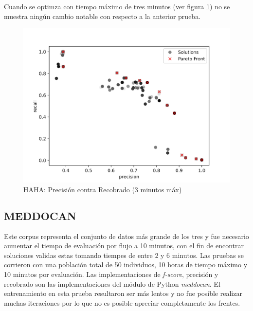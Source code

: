 Cuando se optimza con tiempo m\'aximo de tres minutos (ver figura \ref{impl:fig:haha:precision_vs_recall_3min}) no se muestra ning\'un cambio notable con respecto a la anterior prueba. 

\begin{figure}[ht]
    \centering
    \includegraphics[scale=0.65]{Pictures/haha_precision_vs_recall_3min.jpg}
    \caption{HAHA: Precisi\'on contra Recobrado (3 minutos m\'ax)}
    \label{impl:fig:haha:precision_vs_recall_3min}
\end{figure}

\subsection{MEDDOCAN}
Este corpus representa el conjunto de datos m\'as grande de los tres y  fue necesario aumentar el tiempo de evaluaci\'on por flujo a 10 minutos, con el fin de encontrar soluciones validas estas tomando tiempes de entre 2 y 6 minutos. Las pruebas se corrieron con una poblaci\'on total de 50 individuos, 10 horas de tiempo m\'aximo y 10 minutos por evaluaci\'on. 
Las implementaciones de \textit{f-score}, precisi\'on y recobrado son las implementaciones del m\'odulo de Python \textit{meddocan}.
El entrenamiento en esta prueba resultaron ser m\'as lentos y no fue posible realizar muchas iteraciones por lo que no es posible apreciar completamente los frentes.


